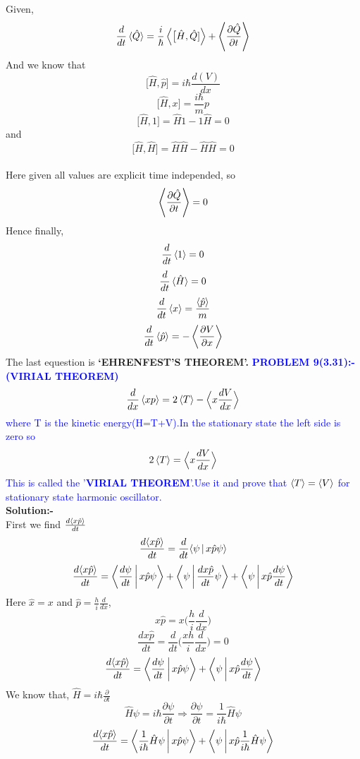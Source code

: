  \hspace*{2cm} Given, $$\frac{d}{dt}\braket{\Hat{Q}}=\frac{i}{\hbar}\Braket{\big[\hat{H},\hat{Q}]}+\Braket{\frac{\partial{\hat{Q}}}{\partial{t}}}$$
 And we know that  $$\big[\hat{H},{\hat{p}}\big]={i}{\hbar}\frac{d(V)}{dx}$$
 $$\big[{\hat{H}},x\big]=\frac{i\hbar}{m}{p}$$
  $$\Big[\hat{H},1 \Big]=\hat{H}{1}-{1}\hat{H}=0$$
  and $$\Big[\hat{H},\hat{H} \Big]=\hat{H}\hat{H}-\hat{H}\hat{H}=0$$\\
  Here given all values are explicit time independed, so $$\Braket{\frac{\partial{\hat{Q}}}{\partial{t}}}=0$$ 
  Hence finally,\\
  $$\frac{d}{dt}\braket{1}=0$$
  $$\frac{d}{dt}\braket{\hat{H}}=0$$
   $$\frac{d}{dt}\braket{x}=\frac{\Braket{\hat{p}}}{m}$$
    $$\frac{d}{dt}\braket{\hat{p}}=-\Braket{\frac{\partial {V}}{\partial{x}}}$$
   The last equestion is  \textbf{`EHRENFEST'S THEOREM'.}
  \newpage
   \textcolor{blue}{ \textbf{PROBLEM 9(3.31):-}  \textbf{(VIRIAL THEOREM)} \\
   $$\frac{d}{dx}\Braket{xp}=2\Braket{T}-\Big{\langle}x\frac{dV}{dx}\Big{\rangle}$$
   where T is the kinetic energy(H=T+V).In the stationary state the left side is zero so\\
   $$2\Braket{T}=\Big{\langle}x\frac{dV}{dx}\Big{\rangle}$$
   This is called the '\textbf{VIRIAL THEOREM}'.Use it and prove that $\Braket{T}=\Braket{V}$ for stationary state harmonic oscillator.}\\
   \textbf{Solution:-}\\
   \hspace*{2cm} First we find $\frac{d{\Braket{x\hat{p}}}}{dt}$\\
    $$\frac{d{\Braket{x\hat{p}}}}{dt}=\frac{d}{dt}{\Braket{\psi|x\hat{p}\psi}}$$
   $$\frac{d{\Braket{x\hat{p}}}}{dt}={\Braket{\frac{d\psi}{dt}|x\hat{p}\psi}}+{\Braket{\psi|\frac{dx\hat{p}}{dt}{\psi}}}+{\Braket{\psi|{x\hat{p}}\frac{d\psi}{dt}}}$$
  Here $\hat{x}=x$ and $\hat{p}=\frac{h}{i}\frac{d}{dx}$,
   $$x\hat{p}=x\Big(\frac{h}{i}\frac{d}{dx}\Big)$$
   $$\frac{dx\hat{p}}{dt}=\frac{d}{dt}\Big(\frac{xh}{i}\frac{d}{dx}\Big)=0$$
    $$\frac{d{\Braket{x\hat{p}}}}{dt}={\Braket{\frac{d\psi}{dt}|x\hat{p}\psi}}+{\Braket{\psi|{x\hat{p}}\frac{d\psi}{dt}}}$$
    We know that, $\hat{H}=i\hbar\frac{\partial}{\partial{t}}$
    $$\hat{H}{\psi}=i\hbar\frac{\partial{\psi}}{\partial{t}}\Rightarrow \frac{\partial{\psi}}{\partial{t}}=\frac{1}{i\hbar}\hat{H}{\psi}$$
   $$\frac{d{\Braket{x\hat{p}}}}{dt}={\Braket{\frac{1}{i\hbar}\hat{H}{\psi}|x\hat{p}\psi}}+{\Braket{\psi|{x\hat{p}}\frac{1}{i\hbar}\hat{H}{\psi}}}$$
